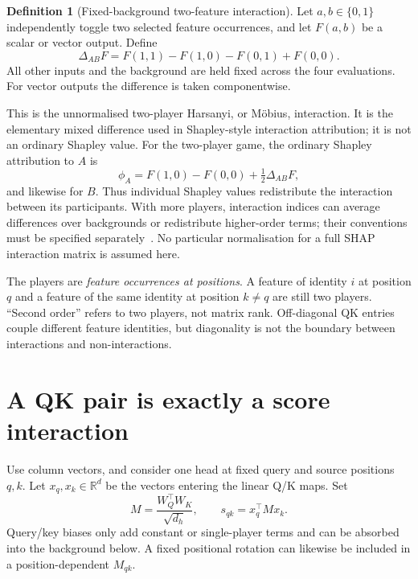 \documentclass[11pt]{article}
\newcommand{\R}{\mathbb{R}}
\newcommand{\pairdiff}{\Delta_{AB}}
\theoremstyle{plain}
\theoremstyle{definition}
\newtheorem{definition}[proposition]{Definition}
\theoremstyle{remark}
\begin{document}
\begin{definition}[Fixed-background two-feature interaction]\label{def:interaction}
Let $a,b\in\{0,1\}$ independently toggle two selected feature occurrences, and let $F(a,b)$ be a scalar or vector output. Define
\begin{equation}
\pairdiff F
 =F(1,1)-F(1,0)-F(0,1)+F(0,0).
\label{eq:delta}
\end{equation}
All other inputs and the background are held fixed across the four evaluations. For vector outputs the difference is taken componentwise.
\end{definition}

This is the unnormalised two-player Harsanyi, or M\"obius, interaction. It is the elementary mixed difference used in Shapley-style interaction attribution; it is not an ordinary Shapley value. For the two-player game, the ordinary Shapley attribution to $A$ is
\begin{equation}
\phi_A=F(1,0)-F(0,0)+\tfrac12\pairdiff F,
\label{eq:shapley}
\end{equation}
and likewise for $B$. Thus individual Shapley values redistribute the interaction between its participants. With more players, interaction indices can average differences over backgrounds or redistribute higher-order terms; their conventions must be specified separately~\cite{sundararajan2020}. No particular normalisation for a full SHAP interaction matrix is assumed here.

The players are \emph{feature occurrences at positions}. A feature of identity $i$ at position $q$ and a feature of the same identity at position $k\ne q$ are still two players. ``Second order'' refers to two players, not matrix rank. Off-diagonal QK entries couple different feature identities, but diagonality is not the boundary between interactions and non-interactions.

\section{A QK pair is exactly a score interaction}

Use column vectors, and consider one head at fixed query and source positions $q,k$. Let $x_q,x_k\in\R^d$ be the vectors entering the linear Q/K maps. Set
\begin{equation}
 M=\frac{W_Q^\top W_K}{\sqrt{d_h}},
 \qquad s_{qk}=x_q^\top Mx_k.
\label{eq:score}
\end{equation}
Query/key biases only add constant or single-player terms and can be absorbed into the background below. A fixed positional rotation can likewise be included in a position-dependent $M_{qk}$.
\end{document}
